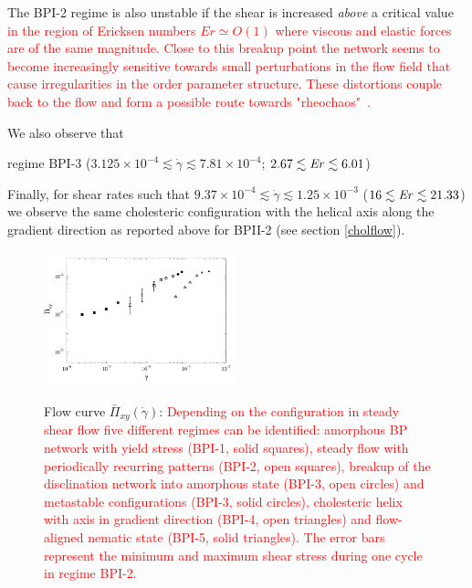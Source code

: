 \documentclass[8.5pt,twoside,twocolumn]{article}
\newcommand{\e}[1]{\times10^{#1}}
\newcommand{\gd}{\dot{\gamma}}
\newcommand{\rev}[1]{{\textcolor{red}{#1}}}
\begin{document}
The BPI-2 regime is also unstable if the shear is increased {\em above} 
a critical value 
\rev{in the region of Ericksen numbers $Er \simeq O(1)$
where viscous and elastic forces are of the same magnitude. 
Close to this breakup point the network seems to become
increasingly sensitive towards small perturbations in the flow field
that cause irregularities in the order parameter structure.
These distortions couple back to the flow and form a possible
route towards "rheochaos"~\cite{rheochaos,Cates:2002}.}

We also observe that 

regime BPI-3 ($3.125\e{-4}\lesssim\gd\lesssim7.81\e{-4}$; $2.67 \lesssim {\it Er} \lesssim 6.01$) 

Finally, for shear rates such that
$9.37\e{-4}\lesssim\gd\lesssim1.25\e{-3}$ ($16 \lesssim {\it Er} \lesssim 21.33$) we observe the same cholesteric 
configuration with the helical axis along the gradient direction as 
reported above for BPII-2 (see
section \ref{cholflow}).
 
\begin{figure}[htpb]
\includegraphics[width=0.495\textwidth]{flowcurve_bp1.pdf}\\
\caption{Flow curve $\bar{\Pi}_{xy}(\gd)$: 
\rev{Depending on the configuration in steady shear flow five different regimes 
can be identified: amorphous BP network with yield stress (BPI-1, solid squares), 
steady flow with periodically recurring patterns (BPI-2, open squares), 
breakup of the disclination network into amorphous state (BPI-3, open circles)
and metastable configurations (BPI-3, solid circles), 
cholesteric helix with axis in gradient direction (BPI-4, open triangles) 
and flow-aligned nematic state (BPI-5, solid triangles). 
The error bars represent the minimum and maximum shear stress 
during one cycle in regime BPI-2.}}
\label{bp1-flowcurve}
\end{figure}
\end{document}
